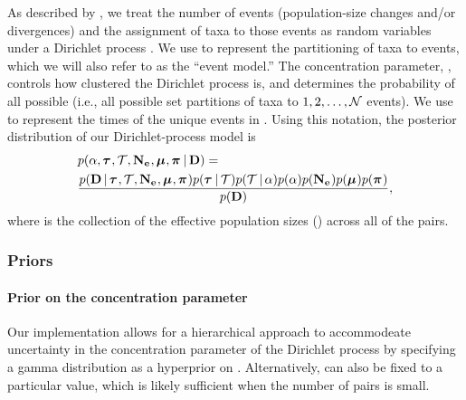 \begin{linenomath}
As described by \citet{Oaks2018ecoevolity},
we treat the number of events (population-size changes and/or divergences)
and the assignment of taxa to those events as
random variables under a Dirichlet process \citep{Ferguson1973,
    Antoniak1974}.
We use \etimesets to represent the partitioning of taxa to events,
which we will also refer to as the ``event model.''
The concentration parameter, \concentration, controls how clustered the
Dirichlet process is, and determines the probability of all possible \etimesets
(i.e., all possible set partitions of taxa to $1, 2, \ldots, \mathcal{N}$ events).
We use \etimes to represent the times of the unique events in \etimesets.
Using this notation, the posterior distribution of our 
Dirichlet-process model is
\begin{equation}
\begin{split}
    & \pr(
    \concentration,
    \etimes,
    \etimesets,
    \collectionpopsizes,
    \murates,
    \gfreqs
    \given
    \alldata
    )
    = \\
    & \frac{
        \pr(
        \alldata
        \given
        \etimes,
        \etimesets,
        \collectionpopsizes,
        \murates,
        \gfreqs
        )
        \pr(\etimes \given \etimesets)%
        \pr(\etimesets \given \concentration)
        \pr(\concentration)
        \pr(\collectionpopsizes)
        \pr(\murates)
        \pr(\gfreqs)
    }{
        \pr(
        \alldata%
        )
    },
    \label{eq:bayesruleexpanded}
\end{split}
\end{equation}
where
\collectionpopsizes
is the collection of the effective population sizes (\comparisonpopsizes{})
across all of the pairs.
\end{linenomath}

\subsubsection{Priors}

\paragraph{Prior on the concentration parameter}
Our implementation allows for a hierarchical approach to accommodeate
uncertainty in the concentration parameter of the Dirichlet process
by specifying a gamma distribution as a hyperprior on
\concentration \citep{Escobar1995,Heath2011}.
Alternatively, \concentration can also be fixed to a particular value,
which is likely sufficient when the number of pairs is small.

